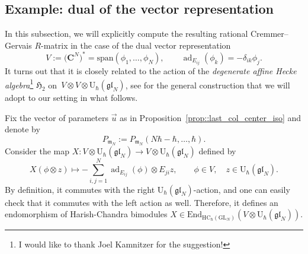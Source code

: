\documentclass[pdftex]{sigma}
\numberwithin{equation}{section}
\newcommand{\C}{\mathbf{C}}
\newcommand{\U}{\mathrm{U}_{\hbar}}
\newcommand{\GL}{\mathrm{GL}}
\newcommand{\m}{\mathfrak{m}}
\DeclareMathOperator{\ad}{ad}
\newcommand{\End}{\mathrm{End}}
\newcommand{\HC}{\mathrm{HC}_{\hbar}}
\newcommand{\gl}{\mathfrak{gl}}
\begin{document}
	\subsection{Example: dual of the vector representation}
	\label{subsect:vector_rep_constant}
	
	In this subsection, we will explicitly compute the resulting rational Cremmer--Gervais $R$-matrix in the case of the dual vector representation
	\[
	V := \bigl(\C^N\bigr)^* = \mathrm{span}(\phi_1,\dots,\phi_N), \qquad \ad_{E_{ij}}(\phi_k) = -\delta_{ik} \phi_j.
	\]
	It turns out that it is closely related to the action of the \emph{degenerate affine Hecke algebra}\footnote{I would like to thank Joel Kamnitzer for the suggestion!} $\mathfrak{H}_2$ on~${V \otimes V \otimes \U(\gl_N)}$, see \cite[Example 2.1]{Cherednik} for the general construction that we will adopt to our setting in what follows.
	
	Fix the vector of parameters $\vec{u}$ as in Proposition~\ref{prop::last_col_center_iso} and denote by
	\[
	P_{\m_N} := P_{\m_N} (N\hbar-\hbar,\dots,\hbar).
	\]
	Consider the map $X\colon V \otimes \U(\gl_N) \rightarrow V \otimes \U(\gl_N)$ defined by
	\[
	X(\phi\otimes z) \mapsto -\sum_{i,j=1}^N \ad_{E_{ij}}(\phi) \otimes E_{ji} z,\qquad \phi \in V, \quad z\in \U(\gl_N).
	\]
	By definition, it commutes with the right $\U(\gl_N)$-action, and one can easily check that it commutes with the left action as well. Therefore, it defines an endomorphism of Harish-Chandra bimodules $X \in \End_{\HC(\GL_N)} (V \otimes \U(\gl_N))$.
	
\end{document}
